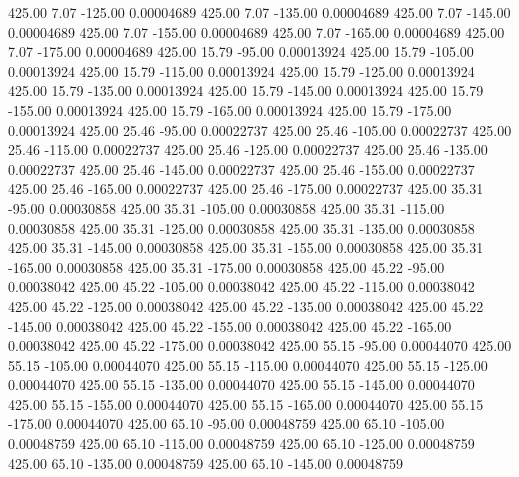     425.00      7.07   -125.00     0.00004689
    425.00      7.07   -135.00     0.00004689
    425.00      7.07   -145.00     0.00004689
    425.00      7.07   -155.00     0.00004689
    425.00      7.07   -165.00     0.00004689
    425.00      7.07   -175.00     0.00004689
    425.00     15.79    -95.00     0.00013924
    425.00     15.79   -105.00     0.00013924
    425.00     15.79   -115.00     0.00013924
    425.00     15.79   -125.00     0.00013924
    425.00     15.79   -135.00     0.00013924
    425.00     15.79   -145.00     0.00013924
    425.00     15.79   -155.00     0.00013924
    425.00     15.79   -165.00     0.00013924
    425.00     15.79   -175.00     0.00013924
    425.00     25.46    -95.00     0.00022737
    425.00     25.46   -105.00     0.00022737
    425.00     25.46   -115.00     0.00022737
    425.00     25.46   -125.00     0.00022737
    425.00     25.46   -135.00     0.00022737
    425.00     25.46   -145.00     0.00022737
    425.00     25.46   -155.00     0.00022737
    425.00     25.46   -165.00     0.00022737
    425.00     25.46   -175.00     0.00022737
    425.00     35.31    -95.00     0.00030858
    425.00     35.31   -105.00     0.00030858
    425.00     35.31   -115.00     0.00030858
    425.00     35.31   -125.00     0.00030858
    425.00     35.31   -135.00     0.00030858
    425.00     35.31   -145.00     0.00030858
    425.00     35.31   -155.00     0.00030858
    425.00     35.31   -165.00     0.00030858
    425.00     35.31   -175.00     0.00030858
    425.00     45.22    -95.00     0.00038042
    425.00     45.22   -105.00     0.00038042
    425.00     45.22   -115.00     0.00038042
    425.00     45.22   -125.00     0.00038042
    425.00     45.22   -135.00     0.00038042
    425.00     45.22   -145.00     0.00038042
    425.00     45.22   -155.00     0.00038042
    425.00     45.22   -165.00     0.00038042
    425.00     45.22   -175.00     0.00038042
    425.00     55.15    -95.00     0.00044070
    425.00     55.15   -105.00     0.00044070
    425.00     55.15   -115.00     0.00044070
    425.00     55.15   -125.00     0.00044070
    425.00     55.15   -135.00     0.00044070
    425.00     55.15   -145.00     0.00044070
    425.00     55.15   -155.00     0.00044070
    425.00     55.15   -165.00     0.00044070
    425.00     55.15   -175.00     0.00044070
    425.00     65.10    -95.00     0.00048759
    425.00     65.10   -105.00     0.00048759
    425.00     65.10   -115.00     0.00048759
    425.00     65.10   -125.00     0.00048759
    425.00     65.10   -135.00     0.00048759
    425.00     65.10   -145.00     0.00048759
